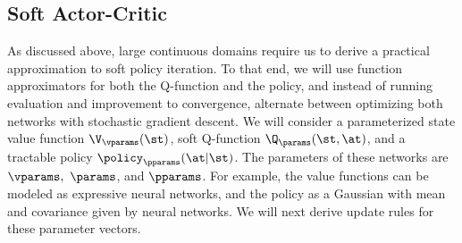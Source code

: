 \documentclass{article}
\begin{document}
\subsection{Soft Actor-Critic}

As discussed above, large continuous domains require us to derive a practical approximation to soft policy iteration. To that end, we will use function approximators for both the Q-function and the policy, and instead of running evaluation and improvement to convergence, alternate between optimizing both networks with stochastic gradient descent.
We will consider a parameterized state value function $\V_\vparams(\st)$, soft Q-function $\Q_\params(\st, \at)$, and a tractable policy $\policy_\pparams(\at|\st)$. The parameters of these networks are $\vparams,\ \params$, and $\pparams$.
For example, the value functions can be modeled as expressive neural networks, and the policy as a Gaussian with mean and covariance given by neural networks. We will next derive update rules for these parameter vectors.
\end{document}
